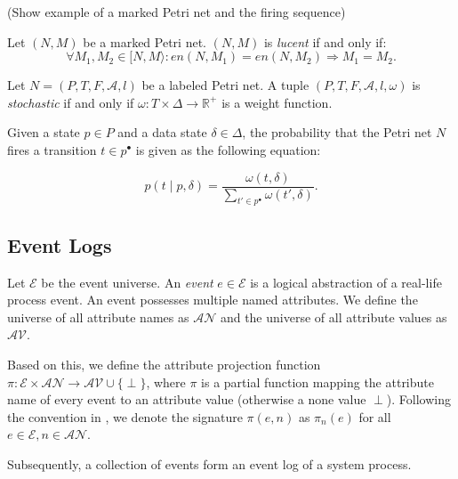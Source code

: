 (Show example of a marked Petri net and the firing sequence)

\begin{definition}[Lucency]
    Let $(N, M)$ be a marked Petri net. $(N, M)$ is \emph{lucent} if and only if:
    \[
        \forall M_1, M_2 \in [N, M \rangle: en(N, M_1) = en(N, M_2) \Rightarrow M_1 = M_2.
    \]
\end{definition}



\begin{definition}
    Let $N = (P, T, F, \mathcal{A}, l)$ be a labeled Petri net. A tuple $(P, T, F, \mathcal{A}, l, \omega)$ is \emph{stochastic} if and only if $\omega: T \times \Delta \to \mathbb{R}^+$ is a weight function.
\end{definition}

Given a state $p \in P$ and a data state $\delta \in \Delta$, the probability that the Petri net $N$ fires a transition $t \in p^{\bullet}$ is given as the following equation:

\[
    p(t \mid p, \delta) = \frac{\omega(t, \delta)}{\sum_{t' \in p^{\bullet}} \omega(t', \delta)}.
\]

\subsection{Event Logs}

\begin{definition}[Event]
    Let $\mathcal{E}$ be the event universe. An \emph{event} $e \in \mathcal{E}$ is a logical abstraction of a real-life process event. An event possesses multiple named attributes. We define the universe of all attribute names as $\mathcal{AN}$ and the universe of all attribute values as $\mathcal{AV}$.  
\end{definition}

Based on this, we define the attribute projection function $\pi: \mathcal{E} \times \mathcal{AN} \rightarrow \mathcal{AV} \cup \{ \perp \}$, where $\pi$ is a partial function mapping the attribute name of every event to an attribute value (otherwise a none value $\perp$). Following the convention in \cite{bible}, we denote the signature $\pi(e, n)$ as $\pi_n(e)$ for all $e \in \mathcal{E}, n \in \mathcal{AN}$.

Subsequently, a collection of events form an event log of a system process.

